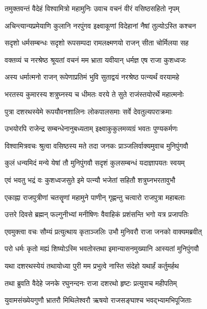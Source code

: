 
\twolineshloka
{तमुक्तवन्तं वैदेहं विश्वामित्रो महामुनिः}
{उवाच वचनं वीरं वसिष्ठसहितो नृपम्} %

\twolineshloka
{अचिन्त्यान्यप्रमेयाणि कुलानि नरपुंगव}
{इक्ष्वाकूणां विदेहानां नैषां तुल्योऽस्ति कश्चन} %

\twolineshloka
{सदृशो धर्मसम्बन्धः सदृशो रूपसम्पदा}
{रामलक्ष्मणयो राजन् सीता चोर्मिलया सह} %

\twolineshloka
{वक्तव्यं च नरश्रेष्ठ श्रूयतां वचनं मम}
{भ्राता यवीयान् धर्मज्ञ एष राजा कुशध्वजः} %

\twolineshloka
{अस्य धर्मात्मनो राजन् रूपेणाप्रतिमं भुवि}
{सुताद्वयं नरश्रेष्ठ पत्न्यर्थं वरयामहे} %

\twolineshloka
{भरतस्य कुमारस्य शत्रुघ्नस्य च धीमतः}
{वरये ते सुते राजंस्तयोरर्थे महात्मनोः} %

\twolineshloka
{पुत्रा दशरथस्येमे रूपयौवनशालिनः}
{लोकपालसमाः सर्वे देवतुल्यपराक्रमाः} %

\twolineshloka
{उभयोरपि राजेन्द्र सम्बन्धेनानुबध्यताम्}
{इक्ष्वाकुकुलमव्यग्रं भवतः पुण्यकर्मणः} %

\twolineshloka
{विश्वामित्रवचः श्रुत्वा वसिष्ठस्य मते तदा}
{जनकः प्राञ्जलिर्वाक्यमुवाच मुनिपुंगवौ} %

\twolineshloka
{कुलं धन्यमिदं मन्ये येषां तौ मुनिपुंगवौ}
{सदृशं कुलसम्बन्धं यदाज्ञापयतः स्वयम्} %

\twolineshloka
{एवं भवतु भद्रं वः कुशध्वजसुते इमे}
{पत्न्यौ भजेतां सहितौ शत्रुघ्नभरतावुभौ} %

\twolineshloka
{एकाह्ना राजपुत्रीणां चतसॄणां महामुने}
{पाणीन् गृह्णन्तु चत्वारो राजपुत्रा महाबलाः} %

\twolineshloka
{उत्तरे दिवसे ब्रह्मन् फल्गुनीभ्यां मनीषिणः}
{वैवाहिकं प्रशंसन्ति भगो यत्र प्रजापतिः} %

\twolineshloka
{एवमुक्त्वा वचः सौम्यं प्रत्युत्थाय कृताञ्जलिः}
{उभौ मुनिवरौ राजा जनको वाक्यमब्रवीत्} %

\twolineshloka
{परो धर्मः कृतो मह्यं शिष्योऽस्मि भवतोस्तथा}
{इमान्यासनमुख्यानि आस्यतां मुनिपुंगवौ} %

\twolineshloka
{यथा दशरथस्येयं तथायोध्या पुरी मम}
{प्रभुत्वे नास्ति संदेहो यथार्हं कर्तुमर्हथ} %

\twolineshloka
{तथा ब्रुवति वैदेहे जनके रघुनन्दनः}
{राजा दशरथो हृष्टः प्रत्युवाच महीपतिम्} %

\twolineshloka
{युवामसंख्येयगुणौ भ्रातरौ मिथिलेश्वरौ}
{ऋषयो राजसङ्घाश्च भवद्भ्यामभिपूजिताः} %

